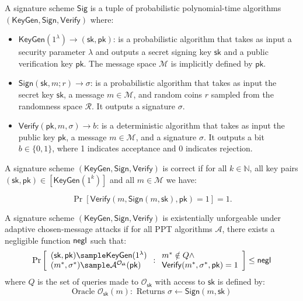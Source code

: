 \begin{definition}
A signature scheme $\mathsf{Sig}$ is a tuple of probabilistic polynomial-time algorithms $(\mathsf{KeyGen}, \mathsf{Sign}, \mathsf{Verify})$ where:

\begin{itemize}
    \item $\mathsf{KeyGen}(1^\lambda) \rightarrow (\mathsf{sk}, \mathsf{pk})$: is a probabilistic algorithm that takes as input a security parameter $\lambda$ and outputs a secret signing key $\mathsf{sk}$ and a public verification key $\mathsf{pk}$. The message space $\mathcal{M}$ is implicitly defined by $\mathsf{pk}$.
    
    \item $\mathsf{Sign}(\mathsf{sk}, m; r) \rightarrow \sigma$: is a probabilistic algorithm that takes as input the secret key $\mathsf{sk}$, a message $m \in \mathcal{M}$, and random coins $r$ sampled from the randomness space $\mathcal{R}$. It outputs a signature $\sigma$.
    
    \item $\mathsf{Verify}(\mathsf{pk}, m, \sigma) \rightarrow b$: is a deterministic algorithm that takes as input the public key $\mathsf{pk}$, a message $m \in \mathcal{M}$, and a signature $\sigma$. It outputs a bit $b \in \{0,1\}$, where 1 indicates acceptance and 0 indicates rejection.
\end{itemize}
\end{definition}

\begin{definition}[Correctness]
A signature scheme $(\mathsf{KeyGen}, \mathsf{Sign}, \mathsf{Verify})$ is correct if for all $k \in \mathbb{N}$, all key pairs $(\mathsf{sk}, \mathsf{pk}) \in [\mathsf{KeyGen}(1^k)]$ and all $m \in \mathcal{M}$ we have:

$$\Pr[\mathsf{Verify}(m, \mathsf{Sign}(m, \mathsf{sk}), \mathsf{pk}) = 1] = 1.$$
\end{definition}

\begin{definition}
A signature scheme $(\mathsf{KeyGen}, \mathsf{Sign}, \mathsf{Verify})$ is existentially unforgeable under adaptive chosen-message attacks if for all PPT algorithms $\mathcal{A}$, there exists a negligible function $\mathsf{negl}$ such that:
$$\Pr\left[\begin{array}{l}
    (\mathsf{sk}, \mathsf{pk}) \sample \mathsf{KeyGen}(1^\lambda) \\
    (m^*, \sigma^*) \sample \mathcal{A}^{\mathcal{O}_{\mathsf{sk}}}(\mathsf{pk})
\end{array} : \begin{array}{l}
    m^* \notin Q \land \\
    \mathsf{Verify}(m^*, \sigma^*, \mathsf{pk}) = 1
\end{array}\right] \leq \negl$$
where $Q$ is the set of queries made to $\mathcal{O}_{\mathsf{sk}}$ with access to $\mathsf{sk}$ is defined by:
\[
\text{Oracle }\mathcal{O}_{\mathsf{sk}}(m): \text{ Returns } \sigma \gets \mathsf{Sign}(m, \mathsf{sk})
\]
\end{definition}




